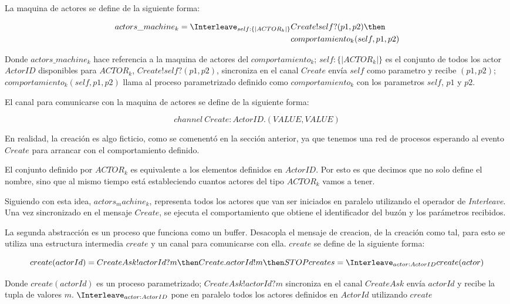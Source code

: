 La maquina de actores se define de la siguiente forma:

\begin{align}
actors\_machine_k = \Interleave_{ self : \{| ACTOR_k |\} } & Create!self?(p1, p2) \then \\
&comportamiento_k(self, p1, p2)
\end{align}

Donde $actors\_machine_k$ hace referencia a la maquina de actores del $comportamiento_k$; $self : \{| ACTOR_k |\}$ es el conjunto de todos los actor $ActorID$ disponibles para $ACTOR_k$, $Create!self?(p1, p2)$, sincroniza en el canal $Create$ envía $self$ como parametro y recibe $(p1, p2)$; $comportamiento_k(self, p1, p2)$ llama al proceso parametrizado definido como $comportamiento_k$ con los parametros $self$, $p1$ y $p2$.

El canal para comunicarse con la maquina de actores se define de la siguiente forma:

\[
channel\ Create:ActorID.(VALUE, VALUE)
\]

En realidad, la creación es algo ficticio, como se comenentó en la sección anterior, ya que tenemos una red de procesos \CSP esperando al evento $Create$ para arrancar con el comportamiento definido. 

El conjunto definido por $ACTOR_k$ es equivalente a los elementos definidos en $ActorID$. Por esto es que decimos que no solo define el nombre, sino que al mismo tiempo está estableciendo cuantos actores del tipo $ACTOR_k$ vamos a tener.

Siguiendo con esta idea, $actors_machine_k$, representa todos los actores que van ser iniciados en paralelo utilizando el operador de \textit{Interleave}. Una vez sincronizado en el mensaje $Create$, se ejecuta el comportamiento que obtiene el identificador del buzón y los parámetros recibidos.

La segunda abstracción es un proceso que funciona como un buffer. Desacopla el mensaje de creacion, de la creación como tal, para esto se utiliza una estructura intermedia $create$ y un canal para comunicarse con ella. $create$ se define de la siguiente forma: 
 
\[
create(actorId) = CreateAsk!actorId?m \then Create.actorId!m \then STOP \\
creates = \Interleave_{actor : ActorID} create(actor)
\]

Donde $create(actorId)$ es un proceso parametrizado; $CreateAsk!actorId?m$ sincroniza en el canal $CreateAsk$ envía $actorId$ y recibe la tupla de valores $m$. $\Interleave_{actor : ActorID}$ pone en paralelo todos los actores definidos en $ActorId$ utilizando $create$

